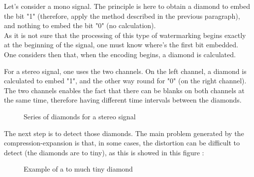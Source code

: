 Let's consider a mono signal. The principle is here to obtain a diamond to embed the bit "1" (therefore, apply the method described in the previous paragraph), and nothing to embed the bit "0" (no calculation).\\
As it is not sure that the processing of this type of watermarking begins exactly at the beginning of the signal, one must know where's the first bit embedded. One considers then that, when the encoding begins, a diamond is calculated.

For a stereo signal, one uses the two channels. On the left channel, a diamond is calculated to embed "1", and the other way round for "0" (on the right channel). The two channels enables the fact that there can be blanks on both channels at the same time, therefore having different time intervals between the diamonds.
\begin{figure}[H]
\caption{\label{stereo watermarking} Series of diamonds for a stereo signal}
\end{figure}

The next step is to detect those diamonds. The main problem generated by the compression-expansion is that, in some cases, the distortion can be difficult to detect (the diamonds are to tiny), as this is showed in this figure :
\begin{figure}[H]
\caption{\label{distortion} Example of a to much tiny diamond}
\end{figure}

